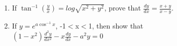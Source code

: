\begin{enumerate}
\item If $\tan^{-1}\left(\frac{y}{x}\right)=log\sqrt{x^2+y^2}$, prove that $\frac{dy}{dx}=\frac{x+y}{x-y}$.
\item If $y=e^{a \cos^{-1}x}$, -1$<$x$<$1, then show that\\
         $(1-x^2)\frac{d^2y}{dx^2}-x\frac{dy}{dx}-a^2y=0$
\end{enumerate}